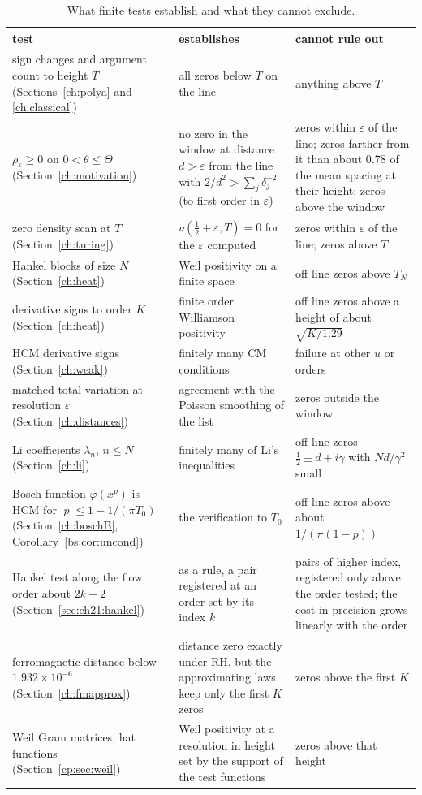 \begin{table}[htbp]
\centering\small
\begin{tabular}{p{}p{}p{}}
\toprule
test & establishes & cannot rule out\\
\midrule
sign changes and argument count to height $T$ (Sections~\ref{ch:polya} and \ref{ch:classical}) & all zeros below $T$ on the line & anything above $T$\\
$\rho_\varepsilon\ge0$ on $0<\theta\le\Theta$ (Section~\ref{ch:motivation}) & no zero in the window at distance $d>\varepsilon$ from the line with $2/d^2>\sum_j\delta_j^{-2}$ (to first order in $\varepsilon$) & zeros within $\varepsilon$ of the line; zeros farther from it than about $0.78$ of the mean spacing at their height; zeros above the window\\
zero density scan at $T$ (Section~\ref{ch:turing}) & $\nu(\frac12+\varepsilon,T)=0$ for the $\varepsilon$ computed & zeros within $\varepsilon$ of the line; zeros above $T$\\
Hankel blocks of size $N$ (Section~\ref{ch:heat}) & Weil positivity on a finite space & off line zeros above $T_N$\\
derivative signs to order $K$ (Section~\ref{ch:heat}) & finite order Williamson positivity & off line zeros above a height of about $\sqrt{K/1.29}$\\
HCM derivative signs (Section~\ref{ch:weak}) & finitely many CM conditions & failure at other $u$ or orders\\
matched total variation at resolution $\varepsilon$ (Section~\ref{ch:distances}) & agreement with the Poisson smoothing of the list & zeros outside the window\\
Li coefficients $\lambda_n$, $n\le N$ (Section~\ref{ch:li}) & finitely many of Li's inequalities & off line zeros $\frac12\pm d+i\gamma$ with $Nd/\gamma^2$ small\\
Bosch function $\varphi(x^p)$ is HCM for $|p|\le1-1/(\pi T_0)$ (Section~\ref{ch:boschB}, Corollary~\ref{bs:cor:uncond}) & the verification to $T_0$ & off line zeros above about $1/(\pi(1-p))$\\
Hankel test along the flow, order about $2k+2$ (Section~\ref{sec:ch21:hankel}) & as a rule, a pair registered at an order set by its index $k$ & pairs of higher index, registered only above the order tested; the cost in precision grows linearly with the order\\
ferromagnetic distance below $1.932\times10^{-6}$ (Section~\ref{ch:fmapprox}) & distance zero exactly under RH, but the approximating laws keep only the first $K$ zeros & zeros above the first $K$\\
Weil Gram matrices, hat functions (Section~\ref{cp:sec:weil}) & Weil positivity at a resolution in height set by the support of the test functions & zeros above that height\\
\bottomrule
\end{tabular}
\caption{What finite tests establish and what they cannot exclude.}
\label{tab:ch13:see}
\end{table}

